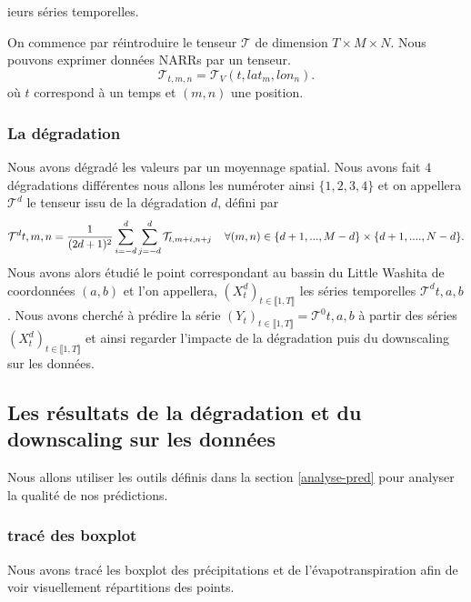 \documentclass[a4paper,10pt]{article}
\begin{document}
ieurs séries temporelles.

On commence par réintroduire le tenseur $\mathcal{T}$ de dimension $T \times M\times N$. Nous pouvons exprimer données NARRs par un tenseur. 
\[\mathcal{T}_{t,m,n}=\mathcal{T}_V(t,lat_m,lon_n).\]
où $t$ correspond à un temps et $(m,n)$ une position.

\subsubsection{La dégradation}

\label{deg-NARR}

Nous avons dégradé les valeurs par un moyennage spatial. Nous avons fait $4$ dégradations différentes nous allons les numéroter ainsi $\{1,2,3,4\}$ et on appellera $\mathcal{T}^{d}$ le tenseur issu de la dégradation $d$, défini par
\begin{equation}
	\label{eq-degradation}
	\mathcal{T}^{d}{t,m,n}=\frac{1}{(2d+1)^2} \sum_{i=-d}^{d}\sum_{j=-d}^{d}\mathcal{T}_{t,m+i,n+j} \hspace{4mm} \forall (m,n) \in \{d+1,...,M-d\}\times\{d+1,...., N-d\}.
\end{equation} 
Nous avons alors étudié le point correspondant au bassin du Little Washita de coordonnées $(a,b)$ et l'on appellera, $(X^d_t)_{t\in \llbracket 1,T \rrbracket}$ les séries temporelles $\mathcal{T}^{d}{t,a,b}$. Nous avons cherché à prédire la série $(Y_t)_{t \in \llbracket 1,T \rrbracket}= \mathcal{T}^{0}{t,a,b}$ à partir des séries $(X^d_t)_{t\in \llbracket 1,T \rrbracket}$ et ainsi regarder l'impacte de la dégradation puis du downscaling sur les données.


\subsection{Les résultats de la dégradation et du downscaling sur les données}
\label{resultats}
Nous allons utiliser les outils définis dans la section \ref{analyse-pred} pour analyser la qualité de nos prédictions.

\subsubsection{tracé des boxplot}

Nous avons tracé les boxplot des précipitations et de l'évapotranspiration afin de voir visuellement répartitions des points.
\end{document}
